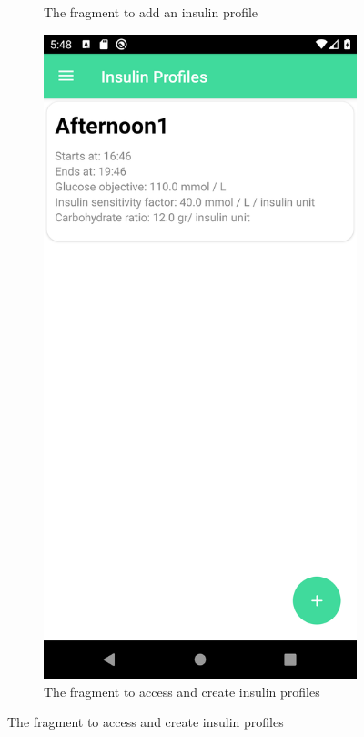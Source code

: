 \begin{figure}[H]
\begin{center}
\begin{subfigure}{.3\textwidth}
            \caption{The fragment to add an insulin profile} 
        \end{subfigure}
        \begin{subfigure}{.3\textwidth}
            \includegraphics[scale=0.1, width=\textwidth]{_figures/insulin_profiles_list.png}
            \caption{The fragment to access and create insulin profiles} 
        \end{subfigure}
    \end{center}
\end{figure}

